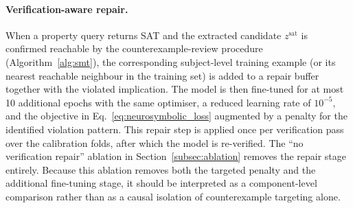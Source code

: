 \documentclass[preprint,11pt]{elsarticle}
\begin{document}
\paragraph{Verification-aware repair.}
When a property query returns SAT and the extracted candidate $z^{\mathrm{sat}}$ is confirmed reachable by the counterexample-review procedure (Algorithm~\ref{alg:smt}), the corresponding subject-level training example (or its nearest reachable neighbour in the training set) is added to a repair buffer together with the violated implication. The model is then fine-tuned for at most 10 additional epochs with the same optimiser, a reduced learning rate of $10^{-5}$, and the objective in Eq.~\eqref{eq:neurosymbolic_loss} augmented by a penalty for the identified violation pattern. This repair step is applied once per verification pass over the calibration folds, after which the model is re-verified. The ``no verification repair'' ablation in Section~\ref{subsec:ablation} removes the repair stage entirely. Because this ablation removes both the targeted penalty and the additional fine-tuning stage, it should be interpreted as a component-level comparison rather than as a causal isolation of counterexample targeting alone.
\end{document}
